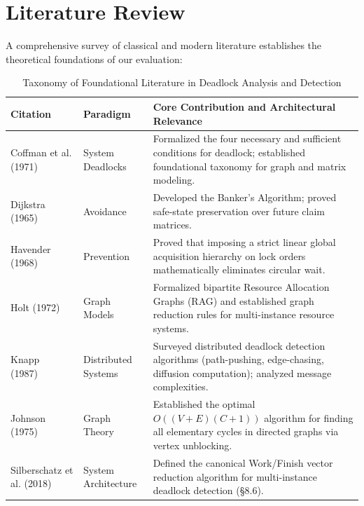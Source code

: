 \documentclass[11pt,a4paper]{article}
\begin{document}
\section{Literature Review}
A comprehensive survey of classical and modern literature establishes the theoretical foundations of our evaluation:

\begin{table}[H]
\centering
\caption{Taxonomy of Foundational Literature in Deadlock Analysis and Detection}
\label{tab:lit_review}
\small
\begin{tabularx}{\textwidth}{p{3.2cm}p{2.5cm}X}
\toprule
\textbf{Citation} & \textbf{Paradigm} & \textbf{Core Contribution and Architectural Relevance} \\
\midrule
Coffman et al. (1971)~\cite{coffman1971system} & System Deadlocks & Formalized the four necessary and sufficient conditions for deadlock; established foundational taxonomy for graph and matrix modeling. \\
Dijkstra (1965)~\cite{dijkstra1965solution} & Avoidance & Developed the Banker's Algorithm; proved safe-state preservation over future claim matrices. \\
Havender (1968)~\cite{havender1968avoiding} & Prevention & Proved that imposing a strict linear global acquisition hierarchy on lock orders mathematically eliminates circular wait. \\
Holt (1972)~\cite{holt1972deadlocks} & Graph Models & Formalized bipartite Resource Allocation Graphs (RAG) and established graph reduction rules for multi-instance resource systems. \\
Knapp (1987)~\cite{knapp1987deadlock} & Distributed Systems & Surveyed distributed deadlock detection algorithms (path-pushing, edge-chasing, diffusion computation); analyzed message complexities. \\
Johnson (1975)~\cite{johnson1975finding} & Graph Theory & Established the optimal $O((V+E)(C+1))$ algorithm for finding all elementary cycles in directed graphs via vertex unblocking. \\
Silberschatz et al. (2018)~\cite{silberschatz2018operating} & System Architecture & Defined the canonical Work/Finish vector reduction algorithm for multi-instance deadlock detection (§8.6). \\
\bottomrule
\end{tabularx}
\end{table}

\end{document}
